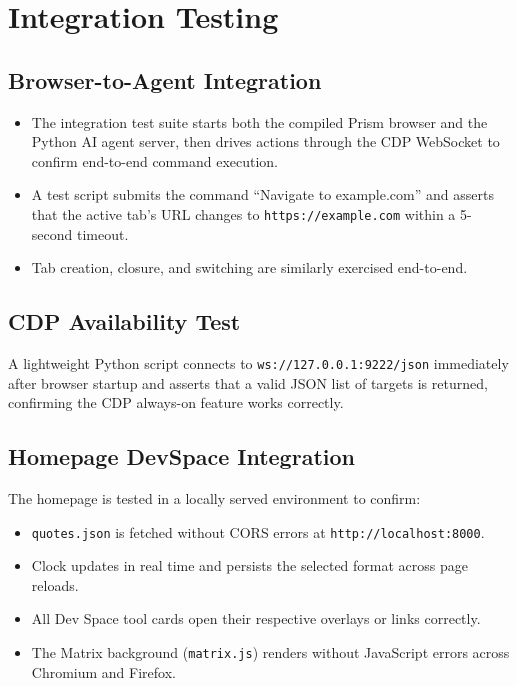 \section{Integration Testing}

\subsection{Browser-to-Agent Integration}
\begin{itemize}[leftmargin=*]
    \item The integration test suite starts both the compiled Prism browser and the Python AI agent server, then drives actions through the CDP WebSocket to confirm end-to-end command execution.
    \item A test script submits the command ``Navigate to example.com'' and asserts that the active tab's URL changes to \texttt{https://example.com} within a 5-second timeout.
    \item Tab creation, closure, and switching are similarly exercised end-to-end.
\end{itemize}

\subsection{CDP Availability Test}
A lightweight Python script connects to \texttt{ws://127.0.0.1:9222/json} immediately after browser startup and asserts that a valid JSON list of targets is returned, confirming the CDP always-on feature works correctly.

\subsection{Homepage DevSpace Integration}
The homepage is tested in a locally served environment to confirm:
\begin{itemize}[leftmargin=*]
    \item \texttt{quotes.json} is fetched without CORS errors at \texttt{http://localhost:8000}.
    \item Clock updates in real time and persists the selected format across page reloads.
    \item All Dev Space tool cards open their respective overlays or links correctly.
    \item The Matrix background (\texttt{matrix.js}) renders without JavaScript errors across Chromium and Firefox.
\end{itemize}

